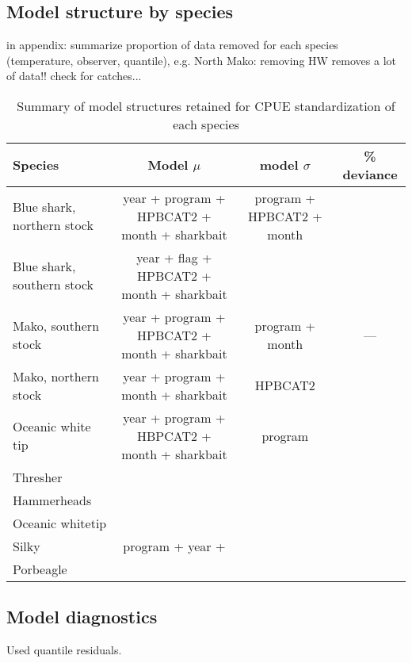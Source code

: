 \documentclass{SCreport}
\begin{document}
\subsection{Model structure by species}
in appendix: summarize proportion of data removed for each species (temperature, observer, quantile), e.g. North Mako: removing HW removes a lot of data!! check for catches...

\clearpage
\begin{landscape}
\thispagestyle{empty}
 
\begin{table}[!h]
\caption{Summary of model structures retained for CPUE standardization of each species}
\begin{center}
\begin{tabular}{l|c|c|c}
Species & Model $\mu$& model $\sigma$ & \% deviance\\
\hline
\hline
Blue shark, northern stock  & year + program + HPBCAT2 + month + sharkbait & program + HPBCAT2 + month&\\
Blue shark, southern stock & year + flag + HPBCAT2 + month + sharkbait & \\ 
Mako, southern stock & year + program + HPBCAT2 + month + sharkbait & program + month & ---\\
Mako, northern stock & year + program + month + sharkbait & HPBCAT2 \\
Oceanic white tip & year + program + HBPCAT2 + month + sharkbait & program \\
Thresher& \\
Hammerheads& \\
Oceanic whitetip& \\
Silky& program + year + \\
Porbeagle& \\ 

\end{tabular}
\end{center}
\end{table}
\end{landscape}
\subsection{Model diagnostics}
Used quantile residuals. 


\BSHnorthaic
\BSHsouthaic
\FALaic
\HHDaic
\MAKnorthaic
\MAKsouthaic
\OCSaic
\PORaic
\THRaic
\end{document}
